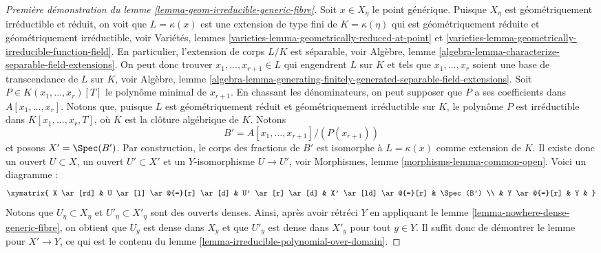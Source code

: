 \begin{proof}[Première démonstration du lemme \ref{lemma-geom-irreducible-generic-fibre}]
\medskip\noindent
Soit $x \in X_\eta$ le point générique. Puisque $X_\eta$ est géométriquement
irréductible et réduit, on voit que $L = \kappa(x)$ est une extension de type fini
de $K = \kappa(\eta)$ qui est géométriquement réduite et
géométriquement irréductible, voir
Variétés, lemmes \ref{varieties-lemma-geometrically-reduced-at-point} et
\ref{varieties-lemma-geometrically-irreducible-function-field}.
En particulier, l'extension de corps $L/K$ est séparable, voir
Algèbre, lemme \ref{algebra-lemma-characterize-separable-field-extensions}.
On peut donc trouver $x_1, \ldots, x_{r + 1} \in L$ qui engendrent $L$
sur $K$ et tels que $x_1, \ldots, x_r$ soient une base de transcendance de
$L$ sur $K$, voir
Algèbre, lemme
\ref{algebra-lemma-generating-finitely-generated-separable-field-extensions}.
Soit $P \in K(x_1, \ldots, x_r)[T]$ le polynôme minimal de
$x_{r + 1}$. En chassant les dénominateurs, on peut supposer que
$P$ a ses coefficients dans $A[x_1, \ldots, x_r]$.
Notons que, puisque $L$ est géométriquement réduit et géométriquement irréductible
sur $K$, le polynôme $P$ est irréductible dans
$\overline{K}[x_1, \ldots, x_r, T]$, où $\overline{K}$ est la
clôture algébrique de $K$. Notons
$$
B' = A[x_1, \ldots, x_{r + 1}]/(P(x_{r + 1}))
$$
et posons $X' = \Spec(B')$. Par construction, le corps des fractions de $B'$
est isomorphe à $L = \kappa(x)$ comme extension de $K$. Il existe donc un
ouvert $U \subset X$, un ouvert $U' \subset X'$ et un $Y$-isomorphisme
$U \to U'$, voir
Morphismes, lemme \ref{morphisms-lemma-common-open}.
Voici un diagramme :
$$
\xymatrix{
X \ar[rd] &
U \ar[l] \ar@{=}[r] \ar[d] &
U' \ar[r] \ar[d] &
X' \ar[ld] \ar@{=}[r] & \Spec(B') \\
& Y \ar@{=}[r] & Y &
}
$$
Notons que $U_\eta \subset X_\eta$ et $U'_\eta \subset X'_\eta$ sont des
ouverts denses. Ainsi, après avoir rétréci $Y$ en appliquant le
lemme \ref{lemma-nowhere-dense-generic-fibre},
on obtient que $U_y$ est dense dans $X_y$ et que $U'_y$ est dense dans $X'_y$
pour tout $y \in Y$. Il suffit donc de démontrer le lemme pour
$X' \to Y$, ce qui est le contenu du
lemme \ref{lemma-irreducible-polynomial-over-domain}.
\end{proof}

